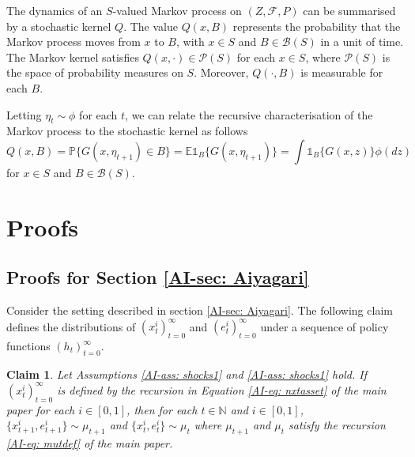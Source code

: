 \documentclass[12pt]{ectaart}
\newcommand{\1}{\mathbbm 1}
\theoremstyle{plain}
\newtheorem{claim}{Claim}[section]
\theoremstyle{definition}
\begin{document}
	The dynamics of an $S$-valued Markov process on $(Z,\mathscr{F}, P)$ can be summarised by a stochastic kernel $Q$. The value $Q(x,B)$ represents the probability that the Markov process moves from $x$ to $B$,  with $x\in S$ and $B\in \mathscr{B}(S)$ in a unit of time. The Markov kernel satisfies $Q(x, \cdot) \in \mathscr{P}({S})$ for each $x\in S$, where  $\mathscr{P}({S})$ is the space of probability measures on $S$. Moreover, $Q(\cdot, B)$ is measurable for each $B$. 
	
	Letting $\eta_{t}\sim \phi$ for each $t$, we can relate the recursive characterisation of the Markov process to the stochastic kernel as follows
	\begin{equation}\label{eq: kersrs}
	Q(x,B) = \mathbb{P}\{G(x,\eta_{t+1})\in B\} = \mathbb{E}\mathbb{1}_{B}\{G(x,\eta_{t+1})\} = \int \mathbb{1}_{B}\{G(x,z)\}\phi(dz)
	\end{equation}
	for $x\in S$ and $B\in \mathscr{B}(S)$.

	   
	   
	   

\section{Proofs}


	\subsection*{Proofs for Section \ref{AI-sec: Aiyagari}}
	
	Consider the setting described in section \ref{AI-sec: Aiyagari}. The following claim defines the  distributions of $(x_{t}^{i})_{t=0}^{\infty}$ and $(e_{t}^{i})_{t=0}^{\infty}$ under a sequence of policy functions $(h_{t})_{t=0}^{\infty}$. 
	
	
	\begin{claim}\label{clm: recmeas}
		Let Assumptions \ref{AI-ass: shocks1} and \ref{AI-ass: shocks1} hold. If $(x_{t}^{i})_{t=0}^{\infty}$ is defined by the recursion in Equation \eqref{AI-eq: nxtasset} of the main paper for each $i\in [0,1]$, then for each $t\in \mathbb{N}$ and $i\in [0,1]$, $\{x_{t+1}^{i}, e_{t+1}^{i}\} \sim \mu_{t+1}$ and $\{x_{t}^{i}, e_{t}^{i}\} \sim \mu_{t}$ where $\mu_{t+1}$ and $\mu_{t}$ satisfy the recursion \eqref{AI-eq: mutdef} of the main paper.
	\end{claim}
	
\end{document}
